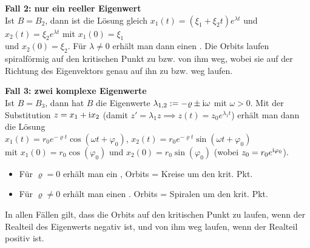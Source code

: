 \textbf{Fall 2: nur ein reeller Eigenwert}\\
Ist $B = B_2$, dann ist die Lösung gleich $x_1(t) = (\xi_1 + \xi_2 t) e^{\lambda t}$ und
$x_2(t) = \xi_2 e^{\lambda t}$ mit $x_1(0) = \xi_1$\\
und $x_2(0) = \xi_2$.
Für $\lambda \not= 0$ erhält man dann einen
.
Die Orbits laufen spiralförmig auf den kritischen Punkt zu bzw. von ihm weg,
wobei sie auf der Richtung des Eigenvektors genau auf ihn zu bzw. weg laufen.

\textbf{Fall 3: zwei komplexe Eigenwerte}\\
Ist $B = B_3$, dann hat $B$ die Eigenwerte $\lambda_{1,2} := -\varrho \pm \text{i}\omega$
mit $\omega > 0$.
Mit der Substitution $z = x_1 + \text{i} x_2$
(damit $z' = \lambda_1 z \implies z(t) = z_0 e^{\lambda_1 t}$) erhält man dann die Lösung\\
$x_1(t) = r_0 e^{-\varrho t} \cos(\omega t + \varphi_0)$,
$x_2(t) = r_0 e^{-\varrho t} \sin(\omega t + \varphi_0)$\\
mit $x_1(0) = r_0 \cos(\varphi_0)$ und
$x_2(0) = r_0 \sin(\varphi_0)$ (wobei $z_0 = r_0 e^{\text{i}\varphi_0}$).
\begin{itemize}
    \item
    Für $\varrho = 0$ erhält man ein ,
    Orbits = Kreise um den krit. Pkt.

    \item
    Für $\varrho \not= 0$ erhält man einen .
    Orbits = Spiralen um den krit. Pkt.
\end{itemize}

In allen Fällen gilt, dass die Orbits auf den kritischen Punkt zu laufen,
wenn der Realteil des Eigenwerts negativ ist, und von ihm weg laufen,
wenn der Realteil positiv ist.

\linie

